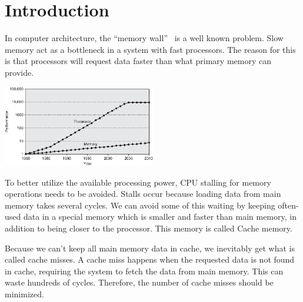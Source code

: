 \section{Introduction} %


In computer architecture, the ``memory wall''~\cite{wulf_mckee_1995}
is a well known problem. Slow memory act as a bottleneck in a system
with fast processors. The reason for this is that processors will
request data faster than what primary memory can provide. %

\begin{center}
  \includegraphics[width=0.5\textwidth]{graphs/memorywall}
\end{center}

To better utilize the available processing power, CPU stalling for
memory operations needs to be avoided. Stalls occur because loading
data from main memory takes several cycles. We can avoid some of this
waiting by keeping often-used data in a special memory which is
smaller and faster than main memory, in addition to being closer to
the processor. This memory is called Cache memory.

Because we can't keep all main memory data in cache, we inevitably get
what is called cache misses. A cache miss happens when the requested
data is not found in cache, requiring the system to fetch the data
from main memory. This can waste hundreds of cycles. Therefore, the
number of cache misses should be minimized.


